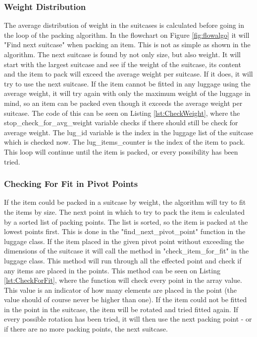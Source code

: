 \subsubsection{Weight Distribution}
The average distribution of weight in the suitcases is calculated before going in the loop of the packing algorithm. In the flowchart on Figure \ref{fig:flowalgo} it will "Find next suitcase" when packing an item. This is not as simple as shown in the algorithm. The next suitcase is found by not only size, but also weight. It will start with the largest suitcase and see if the weight of the suitcase, its content and the item to pack will exceed the average weight per suitcase. If it does, it will try to use the next suitcase. If the item cannot be fitted in any luggage using the average weight, it will try again with only the maximum weight of the luggage in mind, so an item can be packed even though it exceeds the average weight per suitcase. The code of this can be seen on Listing \ref{lst:CheckWeight}, where the stop\_check\_for\_avg\_weight variable checks if there should still be check for average weight. The lug\_id variable is the index in the luggage list of the suitcase which is checked now. The lug\_items\_counter is the index of the item to pack. This loop will continue until the item is packed, or every possibility has been tried.

\subsubsection{Checking For Fit in Pivot Points}
If the item could be packed in a suitcase by weight, the algorithm will try to fit the items by size. The next point in which to try to pack the item is calculated by a sorted list of packing points. The list is sorted, so the item is packed at the lowest points first. This is done in the "find\_next\_pivot\_point" function in the luggage class. If the item placed in the given pivot point without exceeding the dimensions of the suitcase it will call the method in "check\_item\_for\_fit" in the luggage class. This method will run through all the effected point and check if any items are placed in the points. This method can be seen on Listing \ref{lst:CheckForFit}, where the function will check every point in the array value. This value is an indicator of how many elements are placed in the point (the value should of course never be higher than one).
If the item could not be fitted in the point in the suitcase, the item will be rotated and tried fitted again. If every possible rotation has been tried, it will then use the next packing point - or if there are no more packing points, the next suitcase.

